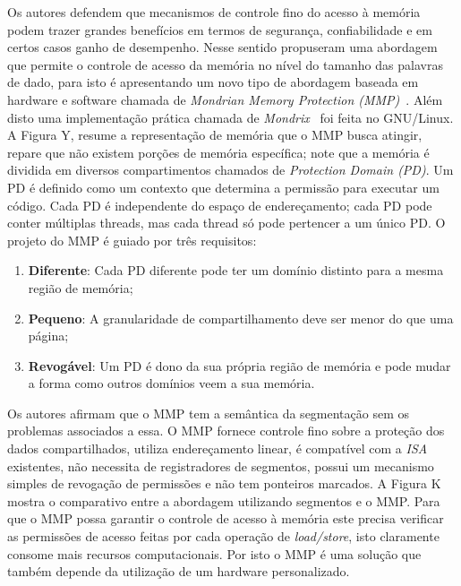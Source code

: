 
Os autores defendem que mecanismos de controle fino do acesso à memória podem
trazer grandes benefícios em termos de segurança, confiabilidade e em certos
casos ganho de desempenho. Nesse sentido \cite{mmp} propuseram uma abordagem
que permite o controle de acesso da memória no nível do tamanho das palavras de
dado, para isto é apresentando um novo tipo de abordagem baseada em hardware e
software chamada de \emph{Mondrian Memory Protection (MMP)}~\citep{mmp}. Além
disto uma implementação prática chamada de \emph{Mondrix}~\cite{mondrix} foi
feita no GNU/Linux. A Figura Y, resume a representação de memória que o MMP
busca atingir, repare que não existem porções de memória específica; note que a
memória é dividida em diversos compartimentos chamados de \emph{Protection
Domain (PD)}. Um PD é definido como um contexto que determina a permissão para
executar um código. Cada PD é independente do espaço de endereçamento; cada PD
pode conter múltiplas threads, mas cada thread só pode pertencer a um único PD.
O projeto do MMP é guiado por três requisitos:

\begin{enumerate}
	\item \textbf{Diferente}: Cada PD diferente pode ter um domínio distinto
				para a mesma região de memória;
	\item \textbf{Pequeno}: A granularidade de compartilhamento deve ser menor
				do que uma página;
	\item \textbf{Revogável}: Um PD é dono da sua própria região de memória e
				pode mudar a forma como outros domínios veem a sua memória.
\end{enumerate}

Os autores afirmam que o MMP tem a semântica da segmentação sem os problemas
associados a essa. O MMP fornece controle fino sobre a proteção dos dados
compartilhados, utiliza endereçamento linear, é compatível com a \emph{ISA}
existentes, não necessita de registradores de segmentos, possui um mecanismo
simples de revogação de permissões e não tem ponteiros marcados. A Figura K
mostra o comparativo entre a abordagem utilizando segmentos e o MMP. Para que o
MMP possa garantir o controle de acesso à memória este precisa verificar as
permissões de acesso feitas por cada operação de \emph{load/store}, isto
claramente consome mais recursos computacionais. Por isto o MMP é uma solução
que também depende da utilização de um hardware personalizado.


